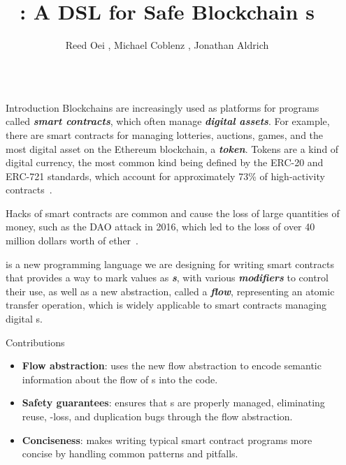 \documentclass[usenames, dvipsnames, final]{beamer}
\title{\langName: A DSL for Safe Blockchain \AssetTxt{}s}
\author{Reed Oei \inst{1}, Michael Coblenz \inst{2}, Jonathan Aldrich \inst{2}}
\institute[shortinst]{\inst{1} University of Illinois \samelineand \inst{2} Carnegie Mellon University}
\newlength{\sepwidth}
\newlength{\colwidth}
\newcommand{\separatorcolumn}{\begin{column}{\sepwidth}\end{column}}
\newcommand{\term}[1]{\textbf{\emph{#1}}}
\begin{document}
\begin{frame}[t]
\begin{columns}[t]
\separatorcolumn

\begin{column}{\colwidth}

  \begin{block}{Introduction}
      Blockchains are increasingly used as platforms for programs called \term{smart contracts}, which often manage \term{digital assets}.
      For example, there are smart contracts for managing lotteries, auctions, games, and the most digital asset on the Ethereum blockchain, a \term{token}.
      Tokens are a kind of digital currency, the most common kind being defined by the ERC-20 and ERC-721 standards, which account for approximately 73\% of high-activity contracts~\cite{OlivaEtAl2019}.

      Hacks of smart contracts are common and cause the loss of large quantities of money, such as the DAO attack in 2016, which led to the loss of over 40 million dollars worth of ether~\cite{DAO}.

      \textcolor{softRed}{\textbf{\langName}} is a new programming language we are designing for writing smart contracts that provides a way to mark values as \term{\assetTxt{}s}, with various \term{modifiers} to control their use, as well as a new abstraction, called a \term{flow}, representing an atomic transfer operation, which is widely applicable to smart contracts managing digital \assetTxt{}s.
  \end{block}

    \begin{alertblock}{Contributions}
      \begin{itemize}
          \item \textbf{Flow abstraction}: \langName uses the new flow abstraction to encode semantic information about the flow of \assetTxt{}s into the code.
          \item \textbf{Safety guarantees}: \langName ensures that \assetTxt{}s are properly managed, eliminating reuse, \assetTxt-loss, and duplication bugs through the flow abstraction.
          \item \textbf{Conciseness}: \langName makes writing typical smart contract programs more concise by handling common patterns and pitfalls.
      \end{itemize}
    \end{alertblock}
\end{column}


\end{columns}
\end{frame}
\end{document}
